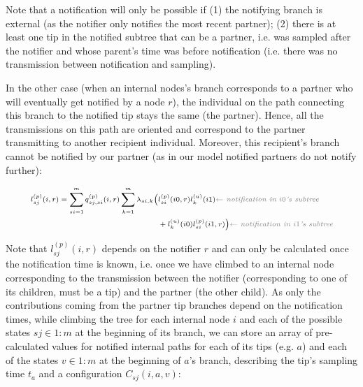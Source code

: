 \documentclass[a4paper,10pt]{article}
\begin{document}
Note that a notification will only be possible if (1) the notifying branch is external (as the notifier only notifies the most recent partner); (2) there is at least one tip in the notified subtree that can be a partner, i.e. was sampled after the notifier and whose parent's time was before notification (i.e. there was no transmission between notification and sampling). 

In the other case (when an internal nodes's branch corresponds to a partner who will eventually get notified by a node $r$), the individual on the path connecting this branch to the notified tip stays the same (the partner). Hence, all the transmissions on this path are oriented and correspond to the partner transmitting to another recipient individual. Moreover, this recipient's branch cannot be notified by our partner (as in our model notified partners do not notify further):

 
\begin{equation}
\scriptsize
\begin{split}
l^{(p)}_{sj}(i, r) = \sum\limits_{si=1}^{m}q^{(p)}_{sj,si}(i,r) \sum\limits_{k=1}^{m}  \lambda_{si,k}\Big(&l^{(p)}_{si}(i0,r)l^{(u)}_{k}(i1) \textit{\color{gray} $\leftarrow$ notification in $i0$'s subtree} \\
 &+ l^{(u)}_{k}(i0)l^{(p)}_{si}(i1,r)\Big)  \textit{\color{gray} $\leftarrow$ notification in $i1$'s subtree} 
\end{split}\label{eq:lu}
\end{equation}

Note that $l^{(p)}_{sj}(i, r)$ depends on the notifier $r$ and can only be calculated once the notification time is known, i.e. once we have climbed to an internal node corresponding to the transmission between the notifier (corresponding to one of its children, must be a tip) and the partner (the other child). As only the contributions coming from the partner tip branches depend on the notification times, while climbing the tree for each internal node $i$ and each of the possible states $sj \in 1:m$ at the beginning of its branch, we can store an array of pre-calculated values for notified internal paths for each of its tips (e.g. $a$) and each of the states $v \in 1:m$ at the beginning of $a$'s branch, describing the tip's sampling time $t_a$ and a configuration $C_{sj}(i,a,v)$: 
\end{document}
